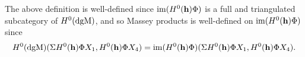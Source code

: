 The above definition is well-defined since \( \operatorname{im}(H^0(\mathbf{h}) \Phi) \) is a full and triangulated subcategory of \( H^0(\operatorname{dgM}) \), and so Massey products is well-defined on \( \operatorname{im}(H^0(\mathbf{h}) \Phi) \) since
\begin{align*}
    H^0(\operatorname{dgM})(\Sigma H^0(\mathbf{h}) \Phi X_1, H^0(\mathbf{h}) \Phi X_4) = \operatorname{im}(H^0(\mathbf{h}) \Phi)(\Sigma H^0(\mathbf{h}) \Phi X_1, H^0(\mathbf{h}) \Phi X_4).
\end{align*}
